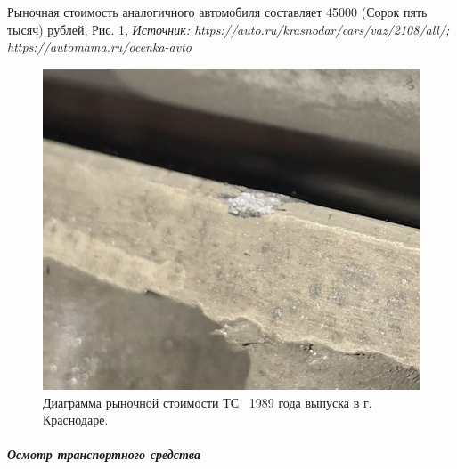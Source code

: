 Рыночная стоимость аналогичного автомобиля составляет 45000 (Сорок пять тысяч) рублей, Рис. \ref{ris:images/2}, 
\textit{Источник: https://auto.ru/krasnodar/cars/vaz/2108/all/; https://automama.ru/ocenka-avto}
\vspace{3mm}
  \begin{figure}[!h]
	\centering
	\includegraphics[width=0.68\linewidth]{images/2}
	\caption{{\footnotesize {Диаграмма рыночной стоимости ТС  \, 1989 года выпуска в г. Краснодаре.  }}}
	\label{ris:images/2}
\end{figure}
\relax
%
\subparagraph{Осмотр транспортного средства }


